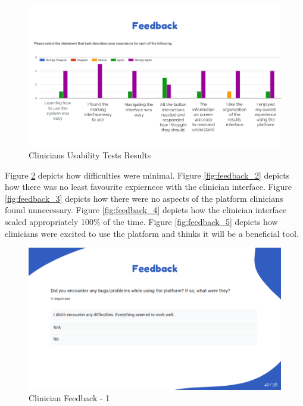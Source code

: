 \documentclass{article}
\begin{document}
\begin{figure}[H]
  \centering
  \includegraphics[width=\textwidth]{images/slide41.png}
  \caption{Clinicians Usability Tests Results}
  \label{fig:clinicians_usability}
\end{figure}

\hspace{2em} Figure \ref{fig:feedback_1} depicts how difficulties were minimal.
Figure \ref{fig:feedback_2} depicts how there was no least favourite expiernece with the clinician interface.
Figure \ref{fig:feedback_3} depicts how there were no aspects of the platform clinicians found unnecessary.
Figure \ref{fig:feedback_4} depicts how the clinician interface scaled appropriately 100\% of the time.
Figure \ref{fig:feedback_5} depicts how clinicians were excited to use the platform and thinks it will be a beneficial tool.

\begin{figure}[H]
  \centering
  \includegraphics[width=\textwidth]{images/slide42.png}
  \caption{Clinician Feedback - 1}
  \label{fig:feedback_1}
\end{figure}
\end{document}
